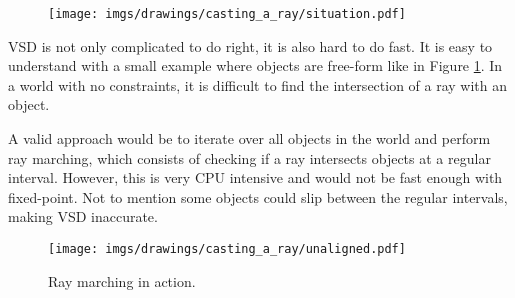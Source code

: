 \begin{figure}[H]
\centering
\texttt{[image: imgs/drawings/casting\_a\_ray/situation.pdf]} 
\caption{}
\label{situation}
\end{figure}
VSD is not only complicated to do right, it is also hard to do fast. It is easy to understand with a small example where objects are free-form like in Figure \ref{situation}. In a world with no constraints, it is difficult to find the intersection of a ray with an object.\\
\par
A valid approach would be to iterate over all objects in the world and perform ray marching, which consists of checking if a ray intersects objects at a regular interval. However, this is very CPU intensive and would not be fast enough with fixed-point. Not to mention some objects could slip between the regular intervals, making VSD inaccurate.
\begin{figure}[H]
\centering
\texttt{[image: imgs/drawings/casting\_a\_ray/unaligned.pdf]}
 \caption{Ray marching in action.}
\end{figure}


